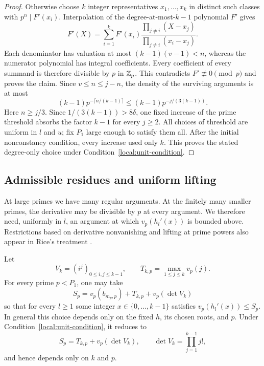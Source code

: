 \begin{proof}
Otherwise choose \(k\) integer representatives \(x_1,\ldots,x_k\) in
distinct such classes with \(p^n\mid F'(x_i)\). Interpolation of the
degree-at-most-\(k-1\) polynomial \(F'\) gives
\[
 F'(X)=\sum_{i=1}^k F'(x_i)
       \frac{\prod_{j\ne i}(X-x_j)}{\prod_{j\ne i}(x_i-x_j)}.
\]
Each denominator has valuation at most \((k-1)(v-1)<n\), whereas the
numerator polynomial has integral coefficients. Every coefficient of every
summand is therefore divisible by \(p\) in \(\mathbb Z_p\). This contradicts
\(F'\not\equiv0\pmod p\) and proves the claim. Since \(v\le n\le j-n\),
the density of the surviving arguments is at most
\[
 (k-1)p^{-\lceil n/(k-1)\rceil}
 \le (k-1)p^{-j/(3(k-1))}.
\]
Here \(n\ge j/3\). Since \(1/(3(k-1))>8\delta\), one fixed increase of
the prime threshold absorbs the factor \(k-1\) for every \(j\ge2\).
All choices of threshold are uniform in \(l\) and \(u\); fix \(P_1\)
large enough to satisfy them all. After the initial nonconstancy condition,
every increase used only \(k\). This proves the stated degree-only choice
under Condition~\eqref{local:unit-condition}.
\end{proof}

\subsection{Admissible residues and uniform lifting}

At large primes we have many regular arguments.
At the finitely many smaller primes, the derivative may be divisible by
\(p\) at every argument. We therefore need, uniformly in \(l\), an argument
at which \(v_p(h_l'(x))\) is bounded above.
Restrictions based on derivative nonvanishing and lifting at prime powers
also appear in Rice's treatment
\cite[Sections~2.4--2.5 and~4 of the revised version]{Rice2019}.

\begin{lemma}\label{local:small-primes}
Let
\[
 V_k=(i^j)_{0\le i,j\le k-1},\qquad
 T_{k,p}=\max_{1\le j\le k}v_p(j).
\]
For every prime \(p<P_1\), one may take
\begin{equation}\label{local:small-prime-choice}
 S_p=v_p(b_{m_p,p})+T_{k,p}+v_p(\det V_k)
\end{equation}
so that for every \(l\ge1\) some integer \(x\in\{0,\ldots,k-1\}\) satisfies
\(v_p(h_l'(x))\le S_p\). In general this choice depends only on the fixed
\(h\), its chosen roots, and \(p\). Under
Condition~\eqref{local:unit-condition}, it reduces to
\[
 S_p=T_{k,p}+v_p(\det V_k),
 \qquad \det V_k=\prod_{j=1}^{k-1}j!,
\]
and hence depends only on \(k\) and \(p\).
\end{lemma}

